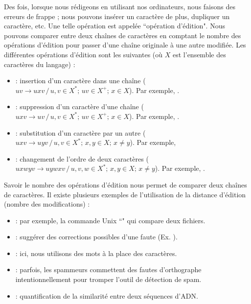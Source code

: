 \documentclass{KodeBook}
\begin{document}
Des fois, lorsque nous rédigeons en utilisant nos ordinateurs, nous faisons des erreurs de frappe ; nous pouvons insérer un caractère de plus, dupliquer un caractère, etc. 
Une telle opération est appelée ``opération d'édition". 
Nous pouvons comparer entre deux chaînes de caractères en comptant le nombre des opérations d'édition pour passer d'une chaîne originale à une autre modifiée.
Les différentes opérations d'édition sont les suivantes (où $X$ est l'ensemble des caractères du langage) :
%
\begin{itemize}
	\item {} : insertion d'un caractère dans une chaîne 
	($uv \rightarrow uxv \,/\, u, v \in X^*;\, uv \in X^+;\, x \in X$).
	Par exemple, .
	
	\item {} : suppression d'un caractère d'une chaîne
	($uxv \rightarrow uv \,/\, u, v \in X^*;\, uv \in X^+;\, x \in X$).
	Par exemple, .
	
	\item {} : substitution d'un caractère par un autre
	($uxv \rightarrow uyv \,/\, u, v \in X^*;\, x, y \in X;\, x \ne y$).
	Par exemple, 
	
	\item {} : changement de l'ordre de deux caractères
	($uxwyv \rightarrow uywxv \,/\, u, v, w \in X^*;\, x, y \in X;\, x \ne y$).
	Par exemple, .
\end{itemize}

Savoir le nombre des opérations d'édition nous permet de comparer deux chaînes de caractères. 
Il existe plusieurs exemples de l'utilisation de la distance d'édition (nombre des modifications) :
\begin{itemize}
	\item {} : par exemple, la commande Unix ``" qui compare deux fichiers.
	\item {} : suggérer des corrections possibles d'une faute (Ex. ).
	\item {} : ici, nous utilisons des mots à la place des caractères.
	\item {} : parfois, les spammeurs commettent des fautes d'orthographe intentionnellement pour tromper l'outil de détection de spam.
	\item {} : quantification de la similarité entre deux séquences d'ADN.
\end{itemize}
\end{document}
